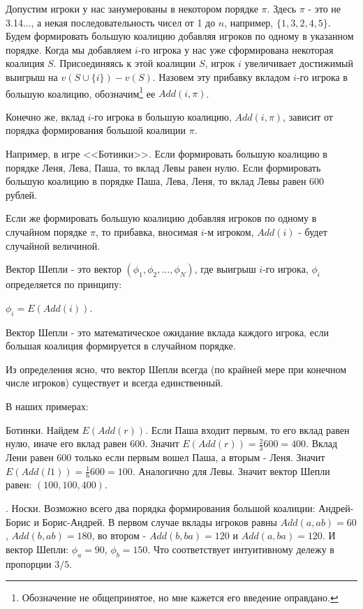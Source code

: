Допустим игроки у нас занумерованы в некотором порядке $\pi$. Здесь $\pi$ - это не 3.14..., а некая последовательность чисел от 1 до $n$, например, $\{1,3,2,4,5\}$. Будем формировать большую коалицию добавляя игроков по одному в указанном порядке. Когда мы добавляем $i$-го игрока у нас уже сформирована некоторая коалиция $S$. Присоединяясь к этой коалиции $S$, игрок $i$ увеличивает достижимый выигрыш на $v(S\cup \{i\})-v(S)$. Назовем эту прибавку вкладом $i$-го игрока в большую коалицию, обозначим\footnote{Обозначение не общепринятое, но мне кажется его введение оправдано.} ее $Add(i,\pi)$.

Конечно же, вклад $i$-го игрока в большую коалицию, $Add(i,\pi)$, зависит от порядка формирования большой коалиции $\pi$. 

Например, в игре <<Ботинки>>. Если формировать большую коалицию в порядке Леня, Лева, Паша, то вклад Левы равен нулю. Если формировать большую коалицию в порядке Паша, Лева, Леня, то вклад Левы равен 600 рублей.

Если же формировать большую коалицию добавляя игроков по одному в случайном порядке $\pi$, то прибавка, вносимая $i$-м игроком, $Add(i)$ - будет случайной величиной.

Вектор Шепли - это вектор $(\phi_{1},\phi_{2},...,\phi_{N})$, где выигрыш $i$-го игрока, $\phi_{i}$ определяется по принципу:

$\phi_{i}=E(Add(i))$.

\begin{mydef} Вектор Шепли  - это математическое ожидание вклада каждого игрока, если большая коалиция формируется в случайном порядке.
\end{mydef}

Из определения ясно, что вектор Шепли всегда (по крайней мере при конечном числе игроков) существует и всегда единственный.

В наших примерах:

\begin{myex} Ботинки. Найдем $E(Add(r))$. Если Паша входит первым, то его вклад равен нулю, иначе его вклад равен 600. Значит $E(Add(r))=\frac{2}{3}600=400$. Вклад Лени равен 600 только если первым вошел Паша, а вторым - Леня. Значит $E(Add(l1))=\frac{1}{6}600=100$. Аналогично для Левы. Значит вектор Шепли равен: $(100,100,400)$.
\end{myex}

\begin{myex}. Носки. Возможно всего два порядка формирования большой коалиции: Андрей-Борис и Борис-Андрей. В первом случае вклады игроков равны $Add(a,ab)=60$, $Add(b,ab)=180$, во втором - $Add(b,ba)=120$ и $Add(a,ba)=120$. И вектор Шепли: $\phi_{a}=90$, $\phi_{b}=150$. Что соответствует интуитивному дележу в пропорции $3/5$.
\end{myex}


